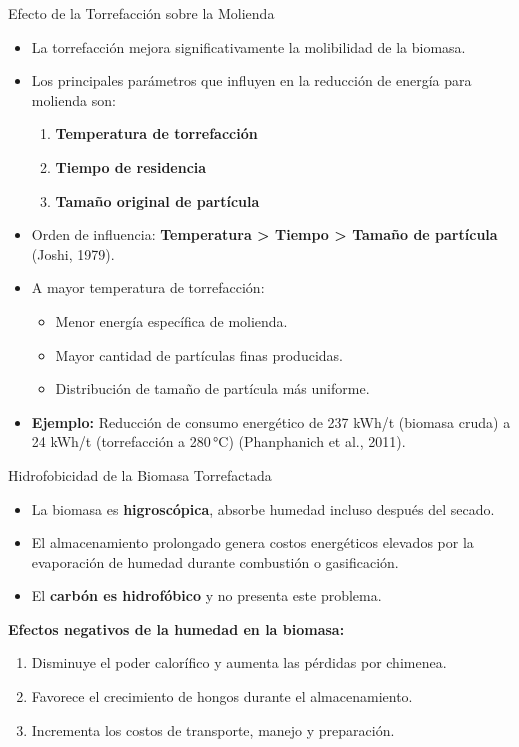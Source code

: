 \documentclass[main.tex]{subfiles}
\begin{document}
\begin{frame}{Efecto de la Torrefacción sobre la Molienda}
\small
\begin{itemize}
    \item La torrefacción mejora significativamente la molibilidad de la biomasa.
    \item Los principales parámetros que influyen en la reducción de energía para molienda son:
    \begin{enumerate}
        \item \textbf{Temperatura de torrefacción}
        \item \textbf{Tiempo de residencia}
        \item \textbf{Tamaño original de partícula}
    \end{enumerate}
    \item Orden de influencia: \textbf{Temperatura > Tiempo > Tamaño de partícula} (Joshi, 1979).
    \item A mayor temperatura de torrefacción:
    \begin{itemize}
        \item Menor energía específica de molienda.
        \item Mayor cantidad de partículas finas producidas.
        \item Distribución de tamaño de partícula más uniforme.
    \end{itemize}
    \item \textbf{Ejemplo:} Reducción de consumo energético de 237 kWh/t (biomasa cruda) a 24 kWh/t (torrefacción a 280 °C) (Phanphanich et al., 2011).
\end{itemize}
\end{frame}

\begin{frame}{Hidrofobicidad de la Biomasa Torrefactada}
\begin{itemize}
    \item La biomasa es \textbf{higroscópica}, absorbe humedad incluso después del secado.
    \item El almacenamiento prolongado genera costos energéticos elevados por la evaporación de humedad durante combustión o gasificación.
    \item El \textbf{carbón es hidrofóbico} y no presenta este problema.
\end{itemize}

\textbf{Efectos negativos de la humedad en la biomasa:}
\begin{enumerate}
    \item Disminuye el poder calorífico y aumenta las pérdidas por chimenea.
    \item Favorece el crecimiento de hongos durante el almacenamiento.
    \item Incrementa los costos de transporte, manejo y preparación.
\end{enumerate}

\end{frame}
\end{document}
